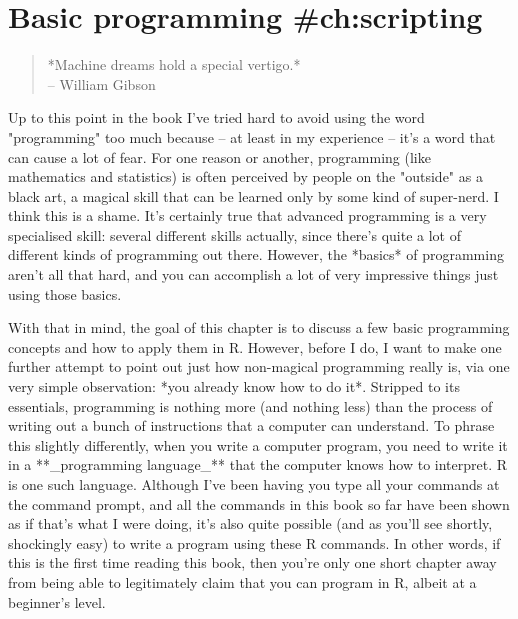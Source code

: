 

\chapter{Basic programming {#ch:scripting}}

\begin{quote}
*Machine dreams hold a special vertigo.* \\
\hspace*{2cm}-- William Gibson
\end{quote}


Up to this point in the book I've tried hard to avoid using the word "programming" too much because -- at least in my experience -- it's a word that can cause a lot of fear. For one reason or another, programming (like mathematics and statistics) is often perceived by people on the "outside" as a black art, a magical skill that can be learned only by some kind of super-nerd. I think this is a shame. It's certainly true that advanced programming is a very specialised skill: several different skills actually, since there's quite a lot of different kinds of programming out there. However, the *basics* of programming aren't all that hard, and you can accomplish a lot of very impressive things just using those basics. 

With that in mind, the goal of this chapter is to discuss a few basic programming concepts and how to apply them in R. However, before I do, I want to make one further attempt to point out just how non-magical programming really is, via one very simple observation: *you already know how to do it*. Stripped to its essentials, programming is nothing more (and nothing less) than the process of writing out a bunch of instructions that a computer can understand. To phrase this slightly differently, when you write a computer program, you need to write it in a **_programming language_** that the computer knows how to interpret. R is one such language. Although I've been having you type all your commands at the command prompt, and all the commands in this book so far have been shown as if that's what I were doing, it's also quite possible (and as you'll see shortly, shockingly easy) to write a program using these R commands. In other words, if this is the first time reading this book, then you're only one short chapter away from being able to legitimately claim that you can program in R, albeit at a beginner's level.    



